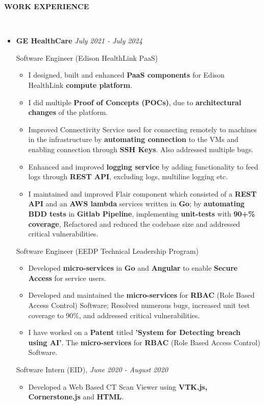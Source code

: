 \documentclass[a4paper,10pt]{article}
\newcommand{\isep}{-2 pt}
\newcommand{\lsep}{-0.6cm}
\newcommand{\resheading}[1]{{\small \colorbox{mygrey}{\begin{minipage}{0.975\textwidth}{\textbf{#1 \vphantom{p\^{E}}}}\end{minipage}}}}
\begin{document}
\resheading{\textbf{WORK EXPERIENCE} }\\[\lsep]
\vspace{1.0pt}
\begin{itemize}
\item \textbf{GE HealthCare} \hfill \emph{July 2021 - July 2024}
\setlength{\itemsep}{1pt}
\setlength{\parskip}{0pt}
\setlength{\parsep}{0pt}

Software Engineer (Edison HealthLink PaaS)
	\begin{itemize}\itemsep \isep
	\item I designed, built and enhanced \textbf{PaaS components} for Edison HealthLink \textbf{compute platform}.
    \item I did multiple \textbf{Proof of Concepts (POCs)}, due to \textbf{architectural changes} of the platform.
    \item Improved Connectivity Service used for connecting remotely to machines in the infrastructure by \textbf{automating connection} to the VMs and enabling connection through \textbf{SSH Keys}. Also addressed multiple bugs.
    \item Enhanced and improved \textbf{logging service} by adding functionality to feed logs through \textbf{REST API}, excluding logs, multiline logging etc.
    \item I maintained and improved Flair component which consisted of a \textbf{REST API} and an \textbf{AWS lambda} services written in \textbf{Go}; by \textbf{automating BDD tests} in \textbf{Gitlab Pipeline}, implementing \textbf{unit-tests} with \textbf{90+\% coverage}, Refactored and reduced the codebase size and addressed critical vulnerabilities. 
	\end{itemize}

Software Engineer (EEDP Technical Leadership Program)
	\begin{itemize}\itemsep \isep
	\item Developed \textbf{micro-services} in \textbf{Go} and \textbf{Angular} to enable \textbf{Secure Access} for service users.
    \item Developed and maintained the \textbf{micro-services} for \textbf{RBAC} (Role Based Access Control) Software; Resolved numerous bugs, increased unit test coverage to 90\%, and addressed critical vulnerabilities.
	\item I have worked on a \textbf{Patent} titled \textbf{'System for Detecting breach using AI'}. The \textbf{micro-services} for \textbf{RBAC} (Role Based Access Control) Software.
	\end{itemize}
 
Software Intern (EID), \hfill \emph{June 2020 - August 2020}
	\begin{itemize}\itemsep \isep
	\item  Developed a Web Based CT Scan Viewer using \textbf{VTK.js, Cornerstone.js} and \textbf{HTML}.
	\end{itemize}
\end{itemize}
\end{document}
